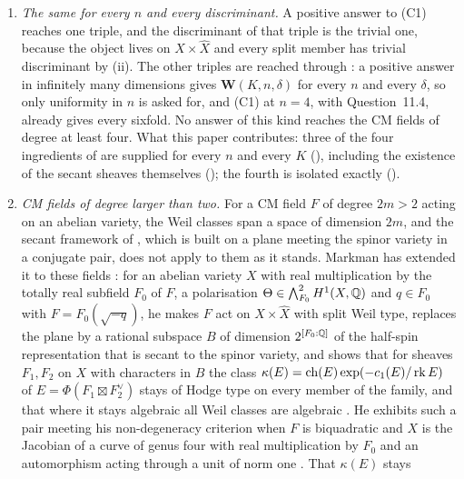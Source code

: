 \begin{enumerate}[label=\textup{(C\arabic*)},leftmargin=3.0em,itemsep=4pt]
  semi-homogeneous bundles (, ), and
  no complete intersection occurs ().
\item \emph{The same for every $n$ and every discriminant.} A positive answer
  to (C1) reaches one triple, and the discriminant of that triple is the
  trivial one, because the object lives on $X\times\widehat X$ and every split
  member has trivial discriminant by (ii). The other
  triples are reached through : a positive answer in
  infinitely many dimensions gives $\mathbf{W}(K,n,\delta)$ for every $n$ and
  every $\delta$, so only uniformity in $n$ is asked for, and (C1) at $n=4$,
  with Question~11.4, already gives every sixfold. No answer of this kind
  reaches the CM fields of degree at least four. What this paper
  contributes: three of the four ingredients of  are supplied
  for every $n$ and every $K$ (), including the
  existence of the secant sheaves themselves (); the
  fourth is isolated exactly ().
\item \emph{CM fields of degree larger than two.} For a CM field $F$ of
  degree $2m>2$ acting on an abelian variety, the Weil classes span a space of
  dimension $2m$, and the secant framework of , which
  is built on a plane meeting the spinor variety in a conjugate pair, does not
  apply to them as it stands. Markman has extended it to these fields
  \cite{Mar25c}: for an abelian variety $X$ with real multiplication by the
  totally real subfield $F_{0}$ of $F$, a polarisation
  $\Theta\in\bigwedge^{2}_{F_{0}}H^{1}(X,\mathbb{Q})$ and $q\in F_{0}$ with
  $F=F_{0}(\sqrt{-q})$, he makes $F$ act on $X\times\widehat{X}$ with split
  Weil type, replaces the plane by a rational subspace $B$ of dimension
  $2^{[F_{0}:\mathbb{Q}]}$ of the half-spin representation that is secant to the
  spinor variety, and shows that for sheaves $F_{1},F_{2}$ on $X$ with
  characters in $B$ the class $\kappa(E)=\operatorname{ch}(E)\exp(-c_{1}(E)/\operatorname{rk} E)$ of
  $E=\Phi(F_{1}\boxtimes F_{2}^{\vee})$ stays of Hodge type on every member
  of the family, and that where it stays algebraic all Weil classes are
  algebraic \cite[Theorem~1.1.2, Proposition~10.2.1]{Mar25c}. He exhibits
  such a pair meeting his non-degeneracy criterion when $F$ is biquadratic
  and $X$ is the Jacobian of a curve of genus four with real multiplication
  by $F_{0}$ and an automorphism acting through a unit of norm one
  \cite[Example~11.2.7, Lemma~11.2.8]{Mar25c}. That $\kappa(E)$ stays

\end{enumerate}
